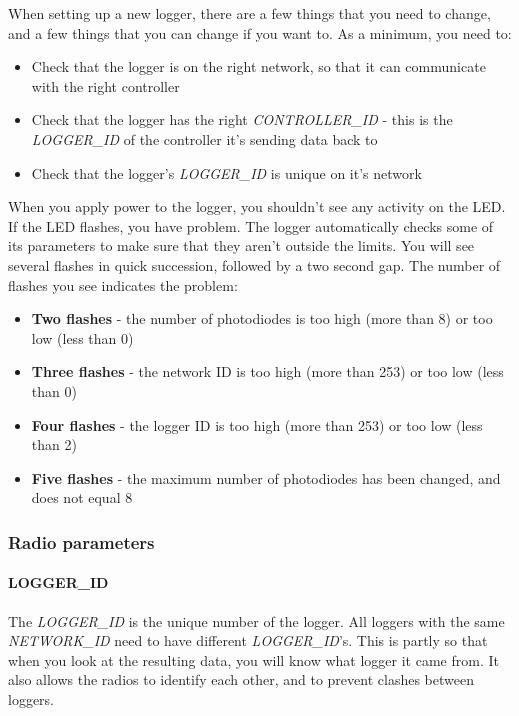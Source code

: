\documentclass[10pt]{article}
\begin{document}
When setting up a new logger, there are a few things that you need to change, and a few things that you can change if you want to. As a minimum, you need to:

\begin{itemize}
 \item Check that the logger is on the right network, so that it can communicate with the right controller
 \item Check that the logger has the right \textit{CONTROLLER\_ID} - this is the \textit{LOGGER\_ID} of the controller it's sending data back to
 \item Check that the logger's \textit{LOGGER\_ID} is unique on it's network
\end{itemize}

When you apply power to the logger, you shouldn't see any activity on the LED. If the LED flashes, you have problem. The logger automatically checks some of its parameters to make sure that they aren't outside the limits. You will see several flashes in quick succession, followed by a two second gap. The number of flashes you see indicates the problem:

\begin{itemize}
 \item \textbf{Two flashes}	- the number of photodiodes is too high (more than 8) or too low (less than 0)
 \item \textbf{Three flashes}	- the network ID is too high (more than 253) or too low (less than 0)
 \item \textbf{Four flashes}	- the logger ID is too high (more than 253) or too low (less than 2)
 \item \textbf{Five flashes}	- the maximum number of photodiodes has been changed, and does not equal 8
\end{itemize}
   
\subsubsection{Radio parameters}

\paragraph{LOGGER\_ID}
The \textit{LOGGER\_ID} is the unique number of the logger. All loggers with the same \textit{NETWORK\_ID} need to have different \textit{LOGGER\_ID}'s. This is partly so 
that when you look at the resulting data, you will know what logger it came from. It also allows the radios to identify each other, and to prevent clashes between 
loggers. 
\end{document}
